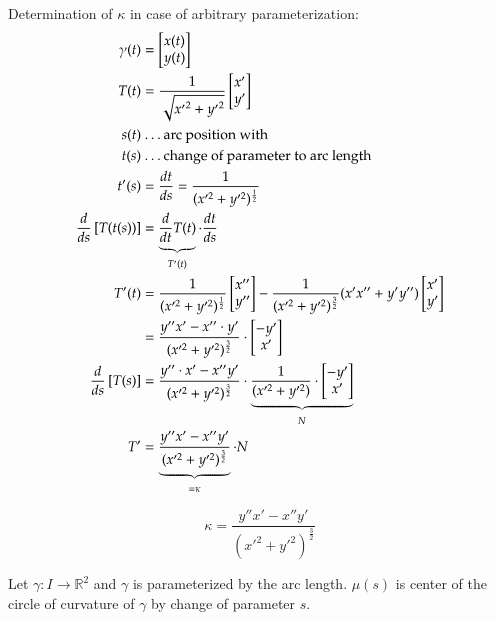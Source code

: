 \documentclass{article}
\begin{document}
Determination of $\kappa$ in case of arbitrary parameterization:
\begin{align*}
  \gamma(t) &= \begin{bmatrix} x(t) \\ y(t) \end{bmatrix} \\
  T(t) &= \frac{1}{\sqrt{{x'}^2 + {y'}^2}} \begin{bmatrix} x' \\ y' \end{bmatrix} \\
  s(t) &\text{ \dots arc position with } \\
  t(s) &\text{ \dots change of parameter to arc length} \\
  t'(s) &= \frac{dt}{ds} = \frac{1}{(x'^2 + y'^2)^{\frac12}} \\
  \frac{d}{ds} \left[T(t(s))\right] &= \underbrace{\frac{d}{dt} T(t)}_{T'(t)} \cdot \frac{dt}{ds} \\
  T'(t) &= \frac{1}{(x'^2 + y'^2)^{\frac12}} \begin{bmatrix} x'' \\ y'' \end{bmatrix} - \frac{1}{(x'^2 + y'^2)^{\frac32}} (x' x'' + y' y'') \begin{bmatrix} x' \\ y' \end{bmatrix} \\
    &= \frac{y'' x' - x'' \cdot y'}{(x'^2 + y'^2)^{\frac32}} \cdot \begin{bmatrix} -y' \\ x' \end{bmatrix} \\
  \frac{d}{ds} \left[T(s)\right] &= \frac{y'' \cdot x' - x'' y'}{(x'^2 + y'^2)^{\frac32}} \cdot \underbrace{\frac{1}{(x'^2 + y'^2)} \cdot \begin{bmatrix} -y' \\ x' \end{bmatrix}}_{N} \\
  T' &= \underbrace{\frac{y'' x' - x'' y'}{(x'^2 + y'^2)^{\frac32}}}_{= \kappa} \cdot N
\end{align*}

\begin{mdframed}
  \[ \kappa = \frac{y'' x' - x'' y'}{(x'^2 + y'^2)^{\frac32}} \]
\end{mdframed}

Let $\gamma: I \to \mathbb R^2$ and $\gamma$ is parameterized by the arc length.
$\mu(s)$ is center of the circle of curvature of $\gamma$ by change of parameter $s$.
\end{document}
